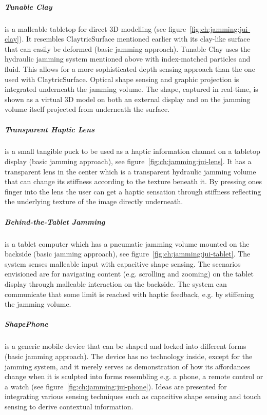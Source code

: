 \subparagraph{Tunable Clay} is a malleable tabletop for direct 3D modelling (see figure~\ref{fig:ch:jamming:jui-clay}).
It resembles ClaytricSurface \citep{matoba2012claytricsurface} mentioned earlier with its clay-like surface that can easily be deformed (basic jamming approach).
Tunable Clay uses the hydraulic jamming system mentioned above with index-matched particles and fluid.
This allows for a more sophisticated depth sensing approach than the one used with ClaytricSurface.
Optical shape sensing and graphic projection is integrated underneath the jamming volume.
The shape, captured in real-time, is shown as a virtual 3D model on both an external display and on the jamming volume itself projected from underneath the surface.

\subparagraph{Transparent Haptic Lens} is a small tangible puck to be used as a haptic information channel on a tabletop display (basic jamming approach), see figure~\ref{fig:ch:jamming:jui-lens}.
It has a transparent lens in the center which is a transparent hydraulic jamming volume that can change its stiffness according to the texture beneath it.
By pressing ones finger into the lens the user can get a haptic sensation through stiffness reflecting the underlying texture of the image directly underneath. 

\subparagraph{Behind-the-Tablet Jamming} is a tablet computer which has a pneumatic jamming volume mounted on the backside (basic jamming approach), see figure~\ref{fig:ch:jamming:jui-tablet}.
The system senses malleable input with capacitive shape sensing.
The scenarios envisioned are for navigating content (e.g. scrolling and zooming) on the tablet display through malleable interaction on the backside. 
The system can communicate that some limit is reached with haptic feedback, 
e.g. by stiffening the jamming volume.

\subparagraph{ShapePhone} is a generic mobile device that can be shaped and locked into different forms (basic jamming approach).
The device has no technology inside, except for the jamming system, and it merely serves as demonstration of how its affordances change when it is sculpted into forms resembling e.g. a phone, a remote control or a watch (see figure~\ref{fig:ch:jamming:jui-phone}).
Ideas are presented for integrating various sensing techniques such as capacitive shape sensing and touch sensing to derive contextual information.

